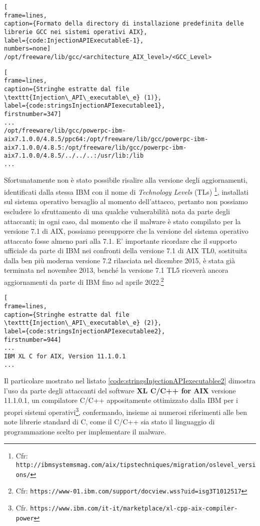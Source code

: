 \documentclass[10pt,a4paper, titlepage]{report}
\begin{document}
\begin{lstlisting}[
frame=lines, 
caption={Formato della directory di installazione predefinita delle librerie GCC nei sistemi operativi AIX}, 
label={code:InjectionAPIExecutableE-1},
numbers=none]
/opt/freeware/lib/gcc/<architecture_AIX_level>/<GCC_Level>
\end{lstlisting}

\begin{lstlisting}[
frame=lines, 
caption={Stringhe estratte dal file \texttt{Injection\_API\_executable\_e} (1)}, 
label={code:stringsInjectionAPIexecutablee1},
firstnumber=347]
...
/opt/freeware/lib/gcc/powerpc-ibm-aix7.1.0.0/4.8.5/ppc64:/opt/freeware/lib/gcc/powerpc-ibm-aix7.1.0.0/4.8.5:/opt/freeware/lib/gcc/powerpc-ibm-aix7.1.0.0/4.8.5/../../..:/usr/lib:/lib
...
\end{lstlisting}

Sfortunatamente non è stato possibile risalire alla versione degli aggiornamenti, identificati dalla stessa IBM con il nome di \textit{Technology Levels} (TLs) \footnote{Cfr: \texttt{http://ibmsystemsmag.com/aix/tipstechniques/migration/oslevel\_versions/}}, installati sul sistema operativo bersaglio al momento dell'attacco, pertanto non possiamo escludere lo sfruttamento di una qualche vulnerabilità nota da parte degli attaccanti; in ogni caso, dal momento che il malware è stato compilato per la versione 7.1 di AIX, possiamo presupporre che la versione del sistema operativo attaccato fosse almeno pari alla 7.1. E' importante ricordare che   il supporto ufficiale da parte di IBM nei confronti della versione 7.1 di AIX TL0, sostituita dalla ben più moderna versione 7.2 rilasciata nel dicembre 2015, è stata già terminata nel novembre 2013, benché la versione 7.1 TL5 riceverà ancora aggiornamenti da parte di IBM fino ad aprile 2022.\footnote{Cfr: \texttt{https://www-01.ibm.com/support/docview.wss?uid=isg3T1012517}}

\begin{lstlisting}[
frame=lines, 
caption={Stringhe estratte dal file \texttt{Injection\_API\_executable\_e} (2)}, 
label={code:stringsInjectionAPIexecutablee2},
firstnumber=944]
...
IBM XL C for AIX, Version 11.1.0.1
...
\end{lstlisting}

Il particolare mostrato nel listato \ref{code:stringsInjectionAPIexecutablee2} dimostra l'uso da parte degli attaccanti del software \textbf{XL C/C++ for AIX} versione 11.1.0.1, un compilatore C/C++ appositamente ottimizzato dalla IBM per i propri sistemi operativi\footnote{Cfr. \texttt{https://www.ibm.com/it-it/marketplace/xl-cpp-aix-compiler-power}}, confermando, insieme ai numerosi riferimenti alle ben note librerie standard di C, come il C/C++ sia stato il linguaggio di programmazione scelto per implementare il malware.
\end{document}
